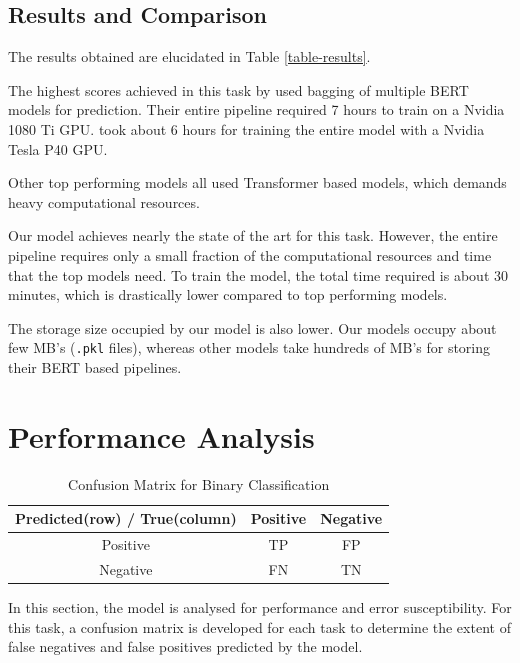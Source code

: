 \documentclass[conference]{IEEEtran}
\begin{document}
\subsection{Results and Comparison}
The results obtained are elucidated in Table \eqref{table-results}.

The highest scores achieved in this task by \cite{risch2020offensive} used bagging of multiple BERT models for prediction. Their entire pipeline required 7 hours to train on a Nvidia 1080 Ti GPU. \cite{Niloofar-etal-TRAC2020-AggressionDetection-BERT-MultiTask} took about 6 hours for training the entire model with a Nvidia Tesla P40 GPU.

Other top performing models \cite{baruah-etal-2020-aggression} all used Transformer based models, which demands heavy computational resources.

Our model achieves nearly the state of the art for this task.
However, the entire pipeline requires only a small fraction of the computational resources and time that the top models need. To train the model, the total time required is  about 30 minutes, which is drastically lower compared to top performing models.

The storage size occupied by our model is also lower. Our models occupy about few MB's (\texttt{.pkl} files), whereas other models take hundreds of MB's for storing their BERT based pipelines.
\section{Performance Analysis}
\begin{table}[t]
\caption{Confusion Matrix for Binary Classification}
\label{table:tab-5}
\centering
    \begin{tabular}{|c|c|c|}
        \hline
        \textbf{Predicted(row) / True(column)} & \textbf{Positive} & \textbf{Negative}\\
        \hline
        Positive & TP & FP   \\
        Negative & FN & TN    \\
        \hline
    \end{tabular}
\end{table}
In this section, the model is analysed for performance and error susceptibility. For this task, a confusion matrix is developed for each task to determine the extent of false negatives and false positives predicted by the model. 
\end{document}
